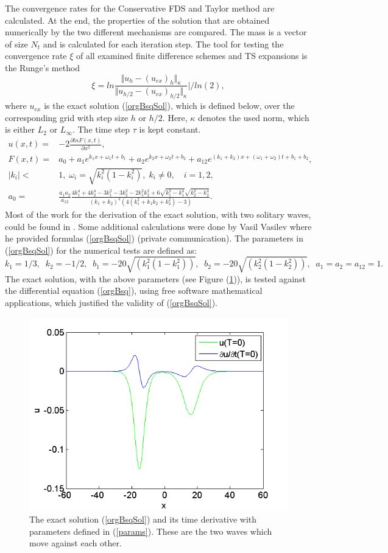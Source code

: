 \documentclass[%
 aip,
cp,  
 amsmath,amssymb,
 reprint,
]{iopconfser}
\newcommand{\be}{\begin{equation}}
\newcommand{\ee}{\end{equation}}
\newcommand{\rf}[1]{(\ref{#1})}
\begin{document}
The convergence rates for the Conservative FDS and Taylor method are calculated. At the end, the properties of the solution that are obtained numerically by the two different mechanisms are compared. The mass is a vector of size $N_t$ and is calculated for each iteration step. The tool for testing the convergence rate $\xi$ of all examined finite difference schemes and TS expansions is the Runge's method
\begin{equation}\label{Runge}
\xi = ln  \frac{\Vert u_{h} - (u_{ex})_{h} \Vert_\kappa } {\Vert  u_{h/2} - (u_{ex})_{h/2} \Vert_\kappa  } | / ln(2),
\end{equation}
where $u_{ex}$ is the exact solution \rf{orgBsqSol}, which is defined below, over the corresponding grid with step size $h$ or $h/2$. Here, $\kappa$ denotes the used norm, which is either $L_2$ or $L_\infty$. The time step $\tau$ is kept constant.
\begin{align}\label{orgBsqSol}
u(x,t) =& -2 \frac{\partial ln F(x,t)}{\partial x^2},
\\
 F(x,t) =& a_0 + a_1 e^{k_1 x + \omega_1 t + b_1} + a_2 e^{k_2 x + \omega_2 t + b_2}  + a_{12} e^{(k_1 + k_2) x + (\omega_1 + \omega_2)  t + b_1 + b_2}, \nonumber
\\
|k_i| <& 1, \; \omega_i = \sqrt{k^2_i(1-k^2_i) }, \; k_i \neq 0, \quad i = 1,2, \nonumber
\\
a_0 =& \frac{a_1 a_2}{a_{12}}\frac{4k_1^4 + 4k_2^4 - 3k_1^2 - 3k_2^2 - 2k_1^2 k_2^2 + 6\sqrt{k_1^2-k_1^4}\sqrt{k_2^2-k_2^4} }{(k_1 + k_2)^2 (4(k_1^2 + k_1 k_2 + k_2^2) - 3)}.\nonumber
\end{align}
Most of the work for the derivation of the exact solution, with two solitary waves, could be found in \cite{exactSol1, exactSol2}. Some additional calculations were done by Vasil Vasilev where he provided formulas \rf{orgBsqSol} (private communication). 
The parameters in \rf{orgBsqSol} for the numerical tests are defined as:
\be\label{params}
        k_1 = 1/3,  \;\; k_2 = -1/2,  \;\; b_1 = -20\sqrt{(k_1^ 2  (1 - k_1 ^ 2))}, \;\; b_2 = -20\sqrt{(k_2^ 2  (1 - k_2^2))},  \;\; a_1 = a_2 = a_{12} = 1.
\ee
The exact solution, with the above parameters (see Figure \rf{ex_sol}), is tested against the differential equation \rf{orgBsq}, using free software mathematical applications, which justified the validity of \rf{orgBsqSol}.
\begin{figure}[ht]\vspace{0.2cm}
  \centering
  \includegraphics[width=0.5\linewidth]{IC.png}
\caption{The exact solution \rf{orgBsqSol} and its time derivative with parameters defined in \rf{params}. These are the two waves which move against each other. }
\label{ex_sol}
\end{figure}
\end{document}
